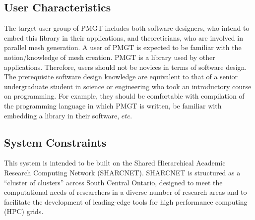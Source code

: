 \documentclass[12pt,titlepage]{article}
\begin{document}
\subsection {User Characteristics}\label{AreqUserchar}
The target user group of PMGT includes both software designers, who intend to embed this library in their applications, and theoreticians, who are involved in parallel mesh generation. A user of PMGT is expected to be familiar with the notion/knowledge of mesh creation. PMGT is a library used by other applications. Therefore, users should not be novices in terms of software design. The prerequisite software design knowledge are equivalent to that of a senior undergraduate student in science or engineering who took an introductory course on programming. For example, they should be comfortable with compilation of the programming language in which PMGT is written, be familiar with embedding a library in their software, $etc.$

\subsection{System Constraints}
This system is intended to be built on the Shared Hierarchical Academic Research Computing Network (SHARCNET). 
SHARCNET is structured as a ``cluster of clusters'' across South Central Ontario, designed to meet the computational needs of researchers in a diverse number of research areas and to facilitate the development of leading-edge tools for high performance computing (HPC) grids.
\end{document}
